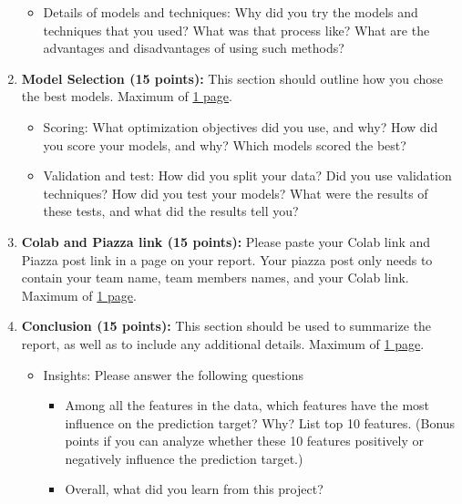 \begin{enumerate}
\begin{itemize}
        \item Details of models and techniques: Why did you try the models and techniques that you used? What was that process like? What are the advantages and disadvantages of using such methods?
    \end{itemize}

    \item \textbf{Model Selection (15 points):} This section should outline how you chose the best models. Maximum of \underline{1 page}.
    \begin{itemize}
        \item Scoring: What optimization objectives did you use, and why? How did you score your models, and why? Which models scored the best?

        \item Validation and test: How did you split your data? Did you use validation techniques? How did you test your models? What were the results of these tests, and what did the results tell you?
    \end{itemize}

    \item \textbf{Colab and Piazza link (15 points):} Please paste your Colab link and Piazza post link in a page on your report. Your piazza post only needs to contain your team name, team members names, and your Colab link. Maximum of \underline{1 page}.

    \item \textbf{Conclusion (15 points):} This section should be used to summarize the report, as well as to include any additional details. Maximum of \underline{1 page}.
    \begin{itemize}
        \item Insights: Please answer the following questions
        \begin{itemize}
            \item Among all the features in the data, which features have the most influence on the prediction target? Why? List top 10 features. (Bonus points if you can analyze whether these 10 features positively or negatively influence the prediction target.)
            \item Overall, what did you learn from this project?
        \end{itemize} 


\end{itemize}
\end{enumerate}
